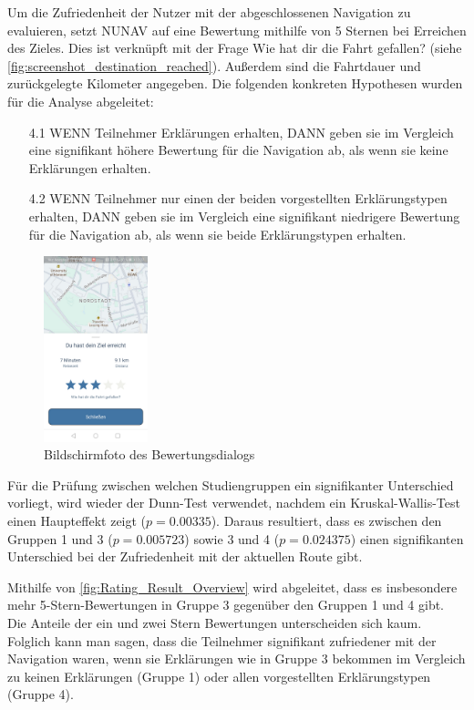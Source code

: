 Um die Zufriedenheit der Nutzer mit der abgeschlossenen Navigation zu evaluieren, setzt NUNAV auf eine Bewertung mithilfe von 5 Sternen bei Erreichen des Zieles. Dies ist verknüpft mit der Frage \glqq Wie hat dir die Fahrt gefallen?\grqq{} (siehe \autoref{fig:screenshot_destination_reached}). Außerdem sind die Fahrtdauer und zurückgelegte Kilometer angegeben. Die folgenden konkreten Hypothesen wurden für die Analyse abgeleitet:

\begin{enumerate}
    \item[4.1] WENN Teilnehmer Erklärungen erhalten, DANN geben sie im Vergleich eine signifikant höhere Bewertung für die Navigation ab, als wenn sie keine Erklärungen erhalten.
    \item[4.2] WENN Teilnehmer nur einen der beiden vorgestellten Erklärungstypen erhalten, DANN geben sie im Vergleich eine signifikant niedrigere Bewertung für die Navigation ab, als wenn sie beide Erklärungstypen erhalten.
\end{enumerate}

\begin{figure}[htb!]
    \centering
    \includegraphics[width=0.27\textwidth]{contents/06_model_evaluation/02_evaluation/res/rating_screenshot.jpg}
    \caption{Bildschirmfoto des Bewertungsdialogs}
    \label{fig:screenshot_destination_reached}
\end{figure}


Für die Prüfung zwischen welchen Studiengruppen ein signifikanter Unterschied vorliegt, wird wieder der Dunn-Test \cite{dunn1964multiple} verwendet, nachdem ein Kruskal-Wallis-Test einen Haupteffekt zeigt ($ p = 0.00335 $). Daraus resultiert, dass es zwischen den Gruppen 1 und 3 ($ p = 0.005723$) sowie 3 und 4 ($ p = 0.024375 $) einen signifikanten Unterschied bei der Zufriedenheit mit der aktuellen Route gibt.

Mithilfe von \autoref{fig:Rating_Result_Overview} wird abgeleitet, dass es insbesondere mehr 5-Stern-Bewertungen in Gruppe 3 gegenüber den Gruppen 1 und 4 gibt. Die Anteile der ein und zwei Stern Bewertungen unterscheiden sich kaum. Folglich kann man sagen, dass die Teilnehmer signifikant zufriedener mit der Navigation waren, wenn sie Erklärungen wie in Gruppe 3 bekommen im Vergleich zu keinen Erklärungen (Gruppe 1) oder allen vorgestellten Erklärungstypen (Gruppe 4).

